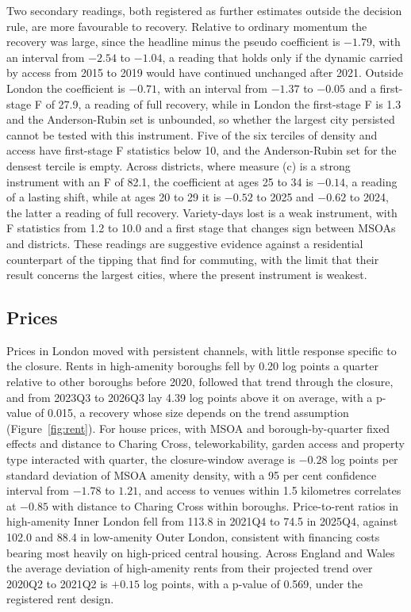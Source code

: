 \documentclass[11pt,a4paper]{article}
\begin{document}
Two secondary readings, both registered as further estimates outside the decision rule, are more favourable to recovery. Relative to ordinary momentum the recovery was large, since the headline minus the pseudo coefficient is $-1.79$, with an interval from $-2.54$ to $-1.04$, a reading that holds only if the dynamic carried by access from 2015 to 2019 would have continued unchanged after 2021. Outside London the coefficient is $-0.71$, with an interval from $-1.37$ to $-0.05$ and a first-stage F of 27.9, a reading of full recovery, while in London the first-stage F is 1.3 and the Anderson-Rubin set is unbounded, so whether the largest city persisted cannot be tested with this instrument. Five of the six terciles of density and access have first-stage F statistics below 10, and the Anderson-Rubin set for the densest tercile is empty. Across districts, where measure (c) is a strong instrument with an F of 82.1, the coefficient at ages 25 to 34 is $-0.14$, a reading of a lasting shift, while at ages 20 to 29 it is $-0.52$ to 2025 and $-0.62$ to 2024, the latter a reading of full recovery. Variety-days lost is a weak instrument, with F statistics from 1.2 to 10.0 and a first stage that changes sign between MSOAs and districts. These readings are suggestive evidence against a residential counterpart of the tipping that \citet{monte2026} find for commuting, with the limit that their result concerns the largest cities, where the present instrument is weakest.

\subsection{Prices}\label{sec:prices}

Prices in London moved with persistent channels, with little response specific to the closure. Rents in high-amenity boroughs fell by 0.20 log points a quarter relative to other boroughs before 2020, followed that trend through the closure, and from 2023Q3 to 2026Q3 lay 4.39 log points above it on average, with a p-value of 0.015, a recovery whose size depends on the trend assumption (Figure~\ref{fig:rent}). For house prices, with MSOA and borough-by-quarter fixed effects and distance to Charing Cross, teleworkability, garden access and property type interacted with quarter, the closure-window average is $-0.28$ log points per standard deviation of MSOA amenity density, with a 95 per cent confidence interval from $-1.78$ to $1.21$, and access to venues within 1.5 kilometres correlates at $-0.85$ with distance to Charing Cross within boroughs. Price-to-rent ratios in high-amenity Inner London fell from 113.8 in 2021Q4 to 74.5 in 2025Q4, against 102.0 and 88.4 in low-amenity Outer London, consistent with financing costs bearing most heavily on high-priced central housing. Across England and Wales the average deviation of high-amenity rents from their projected trend over 2020Q2 to 2021Q2 is $+0.15$ log points, with a p-value of 0.569, under the registered rent design.
\end{document}
